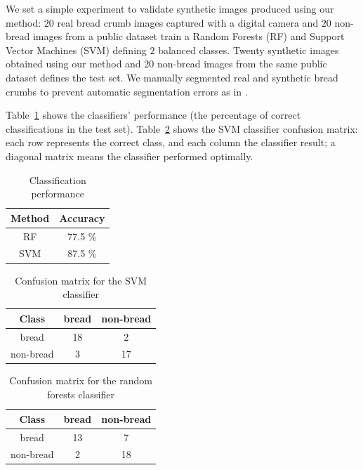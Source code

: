\documentclass[final,5p,times]{elsarticle}
\begin{document}
We set a simple experiment to validate synthetic images produced using our method: $20$ real bread crumb images captured with a digital camera and $20$ non-bread images from a public dataset \cite{FeiFei2004} train a Random Forests (RF) \cite{Breiman2001} and Support Vector Machines (SVM) \cite{Vapnik1995} defining $2$ balanced classes. Twenty synthetic images obtained using our method and $20$ non-bread images from the same public dataset defines the test set. We manually segmented real and synthetic bread crumbs to prevent automatic segmentation errors as in \cite{Bosch2011}.


Table~\ref{Table1} shows the classifiers' performance (the percentage of correct classifications in the test set). Table~\ref{Table2} shows the SVM classifier confusion matrix: each row represents the correct class, and each column the classifier result; a diagonal matrix means the classifier performed optimally.

\begin{table}[htb]
\centering
\begin{tabular}{c|c}
\hline
 Method & Accuracy  \\
\hline
 RF & 77.5 \% \\
SVM  & 87.5 \% \\
\hline
\end{tabular}
\caption{Classification performance }
\label{Table1}
\end{table}

\begin{table}[htb]
\centering
\begin{tabular}{c|c|c}
\hline
 Class & bread & non-bread  \\
 \hline
bread & 18 & 2  \\
 non-bread & 3 & 17  \\
 \hline
\end{tabular}
\caption{Confusion matrix for the SVM classifier}
\label{Table2}
\end{table}

\begin{table}[htb]
\centering
\begin{tabular}{c|c|c}
\hline
 Class & bread & non-bread  \\
 \hline
bread & 13 & 7  \\
 non-bread & 2 & 18  \\
 \hline
\end{tabular}
\caption{Confusion matrix for the random forests classifier}
\label{Table3}
\end{table}
\end{document}
